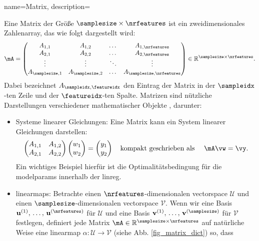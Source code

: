 {
  name={Matrix},
  description={Eine Matrix der Größe $\samplesize \times \nrfeatures$ ist ein zweidimensionales Zahlenarray, 
    das wie folgt dargestellt wird:
    $$
    \mA = \begin{pmatrix}
      A_{1,1} & A_{1,2} & \dots  & A_{1,\nrfeatures} \\
      A_{2,1} & A_{2,2} & \dots  & A_{2,\nrfeatures} \\
      \vdots  & \vdots  & \ddots & \vdots \\
      A_{\samplesize,1} & A_{\samplesize,2} & \dots  & A_{\samplesize,\nrfeatures}
    \end{pmatrix} \in \mathbb{R}^{\samplesize \times \nrfeatures}.
    $$
    Dabei bezeichnet $A_{\sampleidx,\featureidx}$ den Eintrag der Matrix in der $\sampleidx$-ten Zeile 
    und der $\featureidx$-ten Spalte. Matrizen sind nützliche Darstellungen verschiedener mathematischer Objekte \cite{StrangLinAlg2016}, 
    darunter:
    \begin{itemize}
      \item Systeme linearer Gleichungen: Eine Matrix kann ein System linearer Gleichungen darstellen:
      $$
      \begin{pmatrix}
        A_{1,1} & A_{1,2} \\
        A_{2,1} & A_{2,2}
      \end{pmatrix}
      \begin{pmatrix}
        w_1 \\
        w_2
      \end{pmatrix}
      =
      \begin{pmatrix}
        y_1 \\
        y_2
      \end{pmatrix}
      \quad \text{kompakt geschrieben als } \quad \mA \vw = \vy.
      $$
      Ein wichtiges Beispiel hierfür ist die Optimalitätsbedingung für die 
      \glspl{modelparam} innerhalb der \gls{linreg}.
      \item \Glspl{linearmap}: 
      Betrachte einen $\nrfeatures$-dimensionalen \gls{vectorspace} $\mathcal{U}$ und einen $\samplesize$-dimensionalen \gls{vectorspace} $\mathcal{V}$. 
      Wenn wir eine Basis $\mathbf{u}^{(1)},\,\ldots,\,\mathbf{u}^{(\nrfeatures)}$ für $\mathcal{U}$ und eine Basis 
      $\mathbf{v}^{(1)},\,\ldots,\,\mathbf{v}^{(\samplesize)}$ für $\mathcal{V}$ festlegen, definiert jede Matrix 
      $\mA \in \mathbb{R}^{\samplesize \times \nrfeatures}$ auf natürliche Weise eine 
      \gls{linearmap} $\alpha: \mathcal{U} \rightarrow \mathcal{V}$ (siehe Abb. \ref{fig_matrix_dict}) so, dass

\end{itemize}}}

